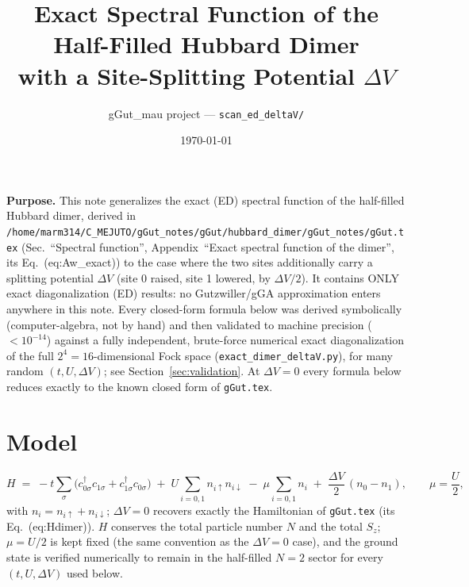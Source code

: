 \documentclass[11pt]{article}
\title{Exact Spectral Function of the Half-Filled Hubbard Dimer\\
with a Site-Splitting Potential $\Delta V$}
\author{gGut\_mau project --- \texttt{scan\_ed\_deltaV/}}
\date{\today}
\newcommand{\acre}[1]{c^{\dagger}_{#1}}
\newcommand{\aani}[1]{c_{#1}}
\begin{document}
\sloppy
\maketitle
\tableofcontents

\bigskip
\noindent\textbf{Purpose.} This note generalizes the exact (ED) spectral function of the
half-filled Hubbard dimer, derived in
\texttt{/home/marm314/C\_MEJUTO/gGut\_notes/gGut/hubbard\_dimer/gGut\_notes/gGut.tex}
(Sec.~``Spectral function'', Appendix~``Exact spectral function of the dimer'', its
Eq.~(eq:Aw\_exact)) to the case where the two sites additionally carry a splitting
potential $\Delta V$ (site 0 raised, site 1 lowered, by $\Delta V/2$). It contains ONLY
exact diagonalization (ED) results: no Gutzwiller/gGA approximation enters anywhere in
this note. Every closed-form formula below was derived symbolically (computer-algebra,
not by hand) and then validated to machine precision ($<10^{-14}$) against a fully
independent, brute-force numerical exact diagonalization of the full $2^4=16$-dimensional
Fock space (\texttt{exact\_dimer\_deltaV.py}), for many random $(t,U,\Delta V)$; see
Section~\ref{sec:validation}. At $\Delta V=0$ every formula below reduces exactly to the
known closed form of \texttt{gGut.tex}.

\section{Model}
\label{sec:model}

\begin{equation}
  H \;=\; -t\sum_{\sigma}\bigl(\acre{0\sigma}\aani{1\sigma}+\acre{1\sigma}\aani{0\sigma}\bigr)
     \;+\;U\sum_{i=0,1}n_{i\uparrow}n_{i\downarrow}
     \;-\;\mu\sum_{i=0,1}n_i
     \;+\;\frac{\Delta V}{2}\,(n_0-n_1),
  \qquad \mu=\frac{U}{2},
  \label{eq:H}
\end{equation}
with $n_i=n_{i\uparrow}+n_{i\downarrow}$; $\Delta V=0$ recovers exactly the Hamiltonian of
\texttt{gGut.tex} (its Eq.~(eq:Hdimer)). $H$ conserves the total particle number $N$ and
the total $S_z$; $\mu=U/2$ is kept fixed (the same convention as the $\Delta V=0$ case),
and the ground state is verified numerically to remain in the half-filled $N=2$ sector for
every $(t,U,\Delta V)$ used below.
\end{document}
